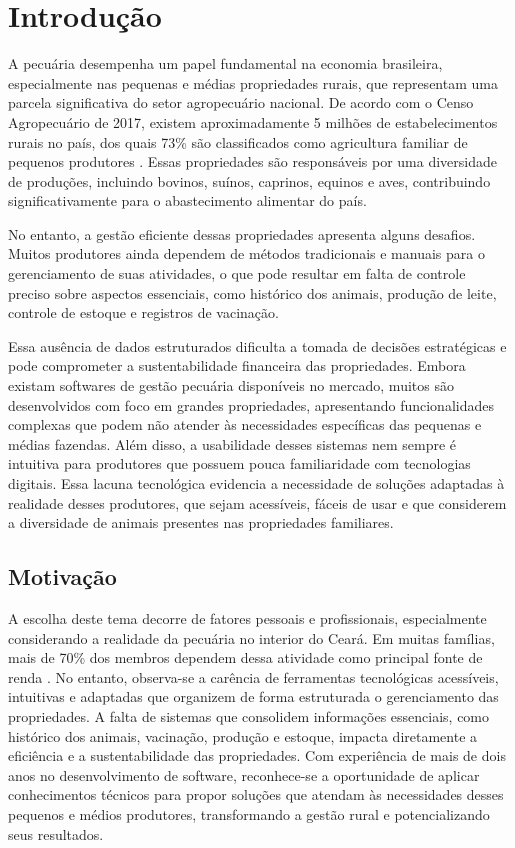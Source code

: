 \chapter{Introdução}
\label{cap:introducao}
A pecuária desempenha um papel fundamental na economia brasileira, especialmente nas pequenas e médias propriedades rurais, que representam uma parcela significativa do setor agropecuário nacional. De acordo com o Censo Agropecuário de 2017, existem aproximadamente 5 milhões de estabelecimentos rurais no país, dos quais 73\% são classificados como agricultura familiar de pequenos produtores \cite{centroAgro2017}. Essas propriedades são responsáveis por uma diversidade de produções, incluindo bovinos, suínos, caprinos, equinos e aves, contribuindo significativamente para o abastecimento alimentar do país.

No entanto, a gestão eficiente dessas propriedades apresenta alguns desafios. Muitos produtores ainda dependem de métodos tradicionais e manuais para o gerenciamento de suas atividades, o que pode resultar em falta de controle preciso sobre aspectos essenciais, como histórico dos animais, produção de leite, controle de estoque e registros de vacinação. 

Essa ausência de dados estruturados dificulta a tomada de decisões estratégicas e pode comprometer a sustentabilidade financeira das propriedades.
Embora existam softwares de gestão pecuária disponíveis no mercado, muitos são desenvolvidos com foco em grandes propriedades, apresentando funcionalidades complexas que podem não atender às necessidades específicas das pequenas e médias fazendas. Além disso, a usabilidade desses sistemas nem sempre é intuitiva para produtores que possuem pouca familiaridade com tecnologias digitais. Essa lacuna tecnológica evidencia a necessidade de soluções adaptadas à realidade desses produtores, que sejam acessíveis, fáceis de usar e que considerem a diversidade de animais presentes nas propriedades familiares.


\section{Motivação}
\label{sec:motivacao}

A escolha deste tema decorre de fatores pessoais e profissionais, especialmente considerando a realidade da pecuária no interior do Ceará. Em muitas famílias, mais de 70\% dos membros dependem dessa atividade como principal fonte de renda \cite{centroAgro2017}. No entanto, observa-se a carência de ferramentas tecnológicas acessíveis, intuitivas e adaptadas que organizem de forma estruturada o gerenciamento das propriedades. A falta de sistemas que consolidem informações essenciais, como histórico dos animais, vacinação, produção e estoque, impacta diretamente a eficiência e a sustentabilidade das propriedades. Com experiência de mais de dois anos no desenvolvimento de software, reconhece-se a oportunidade de aplicar conhecimentos técnicos para propor soluções que atendam às necessidades desses pequenos e médios produtores, transformando a gestão rural e potencializando seus resultados.


